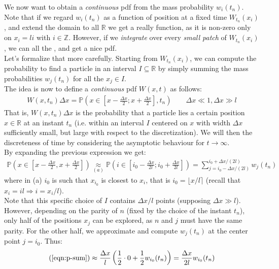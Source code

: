 \documentclass[../template.tex]{subfiles}
\begin{document}
We now want to obtain a \textit{continuous} pdf from the mass probability $w_i(t_n)$. Note that if we regard $w_i(t_n)$ as a function of position at a fixed time $W_{t_n}(x_i)$, and extend the domain to all $\mathbb{R}$ we get a really  function, as it is non-zero only on $x_i = l i$ with $i \in \mathbb{Z}$. However, if we \textit{integrate} over every \textit{small patch} of $W_{t_n}(x_i)$, we can  all the , and get a nice pdf.\\
Let's formalize that more carefully. Starting from $W_{t_n}(x_i)$, we can compute the probability to find a particle in an interval $I \subseteq \mathbb{R}$ by simply summing the mass probabilities $w_j(t_n)$ for all the $x_j \in I$.\\
The idea is now to define a \textit{continuous} pdf $W(x,t)$ as follows:
\begin{align*}
    W(x,t_n) \Delta x = \mathbb{P}\left(x \in \left[x - \frac{\Delta x}{2}; x + \frac{\Delta x}{2}  \right], t_n\right) \qquad \Delta x \ll 1, \Delta x \gg l 
\end{align*}  
That is, $W(x,t_n) \Delta x$ is the probability that a particle lies  a certain position $x \in \mathbb{R}$ at an instant $t_n$ (i.e. within an interval $I$ centered on $x$ with width $\Delta x$ sufficiently small, but large with respect to the discretization). We will then  the discreteness of time by considering the asymptotic behaviour for $t \to \infty$.\\
By expanding the previous expression we get:
\begin{align}
    \mathbb{P}\left (x \in \left[x - \frac{\Delta x}{2}, x + \frac{\Delta x}{2} \right]\right) \underset{(a)}{\approx}  \mathbb{P} \left(i \in \left[i_0- \frac{\Delta x}{2l}; i_0 + \frac{\Delta x}{2l}  \right]\right) = \sum_{j=i_0- \Delta x/(2l)}^{i_0 + \Delta x/(2l)} w_j(t_n)
    \label{eqn:p-sum}
\end{align}    
where in (a) $i_0$ is such that $x_{i_0}$ is closest to $x_i$, that is $i_0 = \lfloor x/l \rceil$  (recall that $x_i = il \Rightarrow i= x_i/l$).\\
Note that this specific choice of $I$ contains $\Delta x/l$ points (supposing $\Delta x \gg l$). However, depending on the parity of $n$ (fixed by the choice of the instant $t_n$), only half of the positions $x_j$ can be explored, as $n$ and $j$ must have the same parity. For the other half, we approximate and compute $w_{j}(t_n)$ at the center point $j=i_0$. Thus:
\begin{align}
    (\ref{eqn:p-sum}) \approx \frac{\Delta x}{l} \left(\frac{1}{2} \cdot 0  + \frac{1}{2} w_{i_0}(t_n) \right) = \frac{\Delta x}{2l} w_{i_0}(t_n) 
\end{align}  
\end{document}
